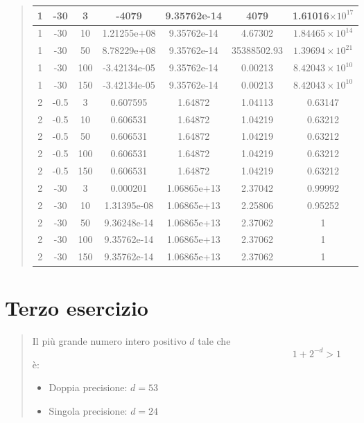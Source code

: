\documentclass[12pt]{article}
\begin{document}
\begin{quote}
\begin{tabular}{| c | c | c | c | c | c | c |}
        \hline
        1 & -30 & 3 & -4079 & 9.35762e-14 & 4079 & 1.61016$\times10^{17}$ \\
        \hline
        1 & -30 & 10 & 1.21255e+08 & 9.35762e-14 & 4.67302 & $1.84465\times10^{14}$ \\
        \hline
        1 & -30 & 50 & 8.78229e+08 & 9.35762e-14 & 35388502.93 & $1.39694\times10^{21}$ \\
        \hline
        1 & -30 & 100 & -3.42134e-05 & 9.35762e-14 & 0.00213 & $8.42043\times10^{10}$\\
        \hline
        1 & -30 & 150 & -3.42134e-05 & 9.35762e-14 & 0.00213 & $8.42043\times10^{10}$ \\
        \hline
        2 & -0.5 & 3 & 0.607595 & 1.64872 & 1.04113 & 0.63147 \\
        \hline
        2 & -0.5 & 10 & 0.606531 & 1.64872 & 1.04219 & 0.63212 \\
        \hline
        2 & -0.5 & 50 & 0.606531 & 1.64872 & 1.04219 & 0.63212 \\
        \hline
        2 & -0.5 & 100 & 0.606531 & 1.64872 & 1.04219 & 0.63212 \\
        \hline
        2 & -0.5 & 150 & 0.606531 & 1.64872 & 1.04219 & 0.63212 \\
        \hline
        2 & -30 & 3 & 0.000201 & 1.06865e+13 & 2.37042 & 0.99992 \\
        \hline
        2 & -30 & 10 & 1.31395e-08 & 1.06865e+13 & 2.25806 & 0.95252 \\
        \hline
        2 & -30 & 50 & 9.36248e-14 & 1.06865e+13 & 2.37062 & 1 \\
        \hline
        2 & -30 & 100 & 9.35762e-14 & 1.06865e+13 & 2.37062 & 1 \\
        \hline
        2 & -30 & 150 & 9.35762e-14 & 1.06865e+13 & 2.37062 & 1 \\
        \hline
    \end{tabular}
\end{quote}
\newpage
\section{Terzo esercizio}
\begin{quote}
    Il più grande numero intero positivo $d$ tale che \begin{equation*}
        1+2^{-d} > 1
    \end{equation*}
    è:
    \begin{itemize}
        \item Doppia precisione: $d=53$
        \item Singola precisione: $d=24$
    \end{itemize}
\end{quote}
\end{document}
